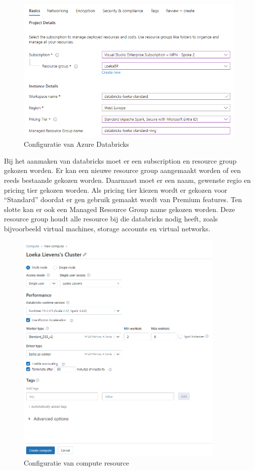 \begin{figure}[H]
    \centering
    \includegraphics[width=1\textwidth]{./graphics/databricks/initial_2.png}
    \caption{Configuratie van Azure Databricks}
    \label{fig:conf-databricks}
\end{figure}

Bij het aanmaken van databricks moet er een subscription en resource group gekozen worden. Er kan een nieuwe resource group aangemaakt worden of een reeds bestaande gekozen worden. Daarnaast moet er een naam, gewenste regio en pricing tier gekozen worden. Als pricing tier kiezen wordt er gekozen voor ``Standard'' doordat er gen gebruik gemaakt wordt van Premium features. Ten slotte kan er ook een Managed Resource Group name gekozen worden. Deze resource group houdt alle resource bij die databricks nodig heeft, zoals bijvoorbeeld virtual machines, storage accounts en virtual networks.

\begin{figure}[H]
    \centering
    \includegraphics[width=0.9\textwidth]{./graphics/databricks/initial_5.png}
    \caption{Configuratie van compute resource}
\end{figure}

